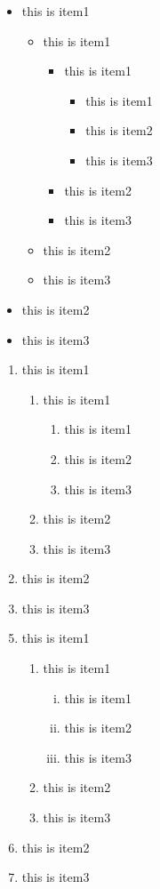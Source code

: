 \documentclass{book} %
\begin{document}
\begin{itemize}
	\item this is item1
	\begin{itemize}
		\item this is item1
		\begin{itemize}
			\item this is item1
			\begin{itemize}
				\item this is item1
				\item this is item2
				\item this is item3
			\end{itemize}
			\item this is item2
			\item this is item3
		\end{itemize}
		\item this is item2
		\item this is item3
	\end{itemize}
	\item this is item2
	\item this is item3
\end{itemize}

\begin{enumerate}
	\item this is item1
	\begin{enumerate}
		\item this is item1
		\begin{enumerate}
			\item this is item1
			\item this is item2
			\item this is item3 
		\end{enumerate}
		\item this is item2
		\item this is item3 
	\end{enumerate}
	\item this is item2
	\item this is item3 
\end{enumerate}

\begin{enumerate}[\bfseries A.]
\setcounter{enumi}{4}
	\item this is item1
	\begin{enumerate}[\sffamily a.]
		\item this is item1
		\begin{enumerate}[i.]
			\item this is item1
			\item this is item2
			\item this is item3 
		\end{enumerate}
		\item this is item2
		\item this is item3 
	\end{enumerate}
	\item this is item2
	\item this is item3 
\end{enumerate}
\end{document}
